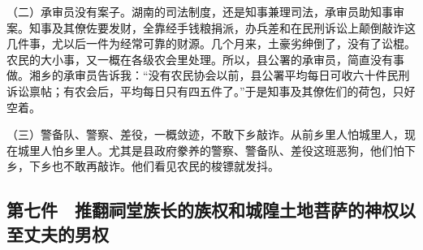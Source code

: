 （二）承审员没有案子。湖南的司法制度，还是知事兼理司法，承审员助知事审案。知事及其僚佐要发财，全靠经手钱粮捐派，办兵差和在民刑诉讼上颠倒敲诈这几件事，尤以后一件为经常可靠的财源。几个月来，土豪劣绅倒了，没有了讼棍。农民的大小事，又一概在各级农会里处理。所以，县公署的承审员，简直没有事做。湘乡的承审员告诉我：“没有农民协会以前，县公署平均每日可收六十件民刑诉讼禀帖；有农会后，平均每日只有四五件了。”于是知事及其僚佐们的荷包，只好空着。

（三）警备队、警察、差役，一概敛迹，不敢下乡敲诈。从前乡里人怕城里人，现在城里人怕乡里人。尤其是县政府豢养的警察、警备队、差役这班恶狗，他们怕下乡，下乡也不敢再敲诈。他们看见农民的梭镖就发抖。

\subsection*{第七件　推翻祠堂族长的族权和城隍土地菩萨的神权以至丈夫的男权}

